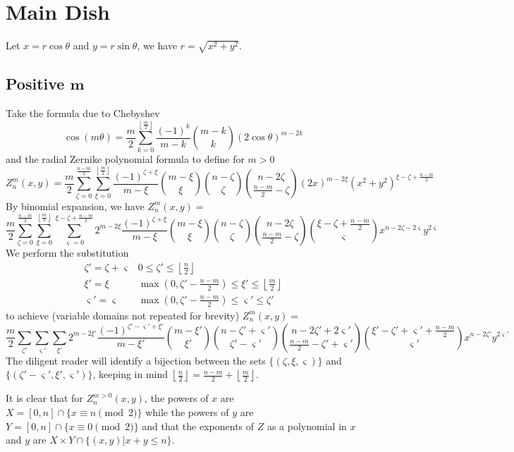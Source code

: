 \documentclass[showpacs,%
  nofootinbib,aps,superscriptaddress,%
  eqsecnum,prd,notitlepage,showkeys,10pt]{article}
\begin{document}
\section{Main Dish}
\label{sec:maindish}

Let $x=r\cos\theta$ and $y=r\sin\theta$, we have $r=\sqrt{x^2+y^2}$.

\subsection{Positive $\boldsymbol m$}
\label{sec:pm}
Take the formula due to Chebyshev
\[\cos(m\theta)=\frac m2\sum_{k=0}^{\left\lfloor\frac m2\right\rfloor}\frac{(-1)^k}{m-k}\binom{m-k}k(2\cos\theta)^{m-2k}\]
and the radial Zernike polynomial formula to define for $m>0$
\[Z_n^m(x,y)=\frac m2\sum_{\zeta=0}^{\frac{n-m}2}\sum_{\xi=0}^{\left\lfloor\frac m2\right\rfloor}\frac{(-1)^{\zeta+\xi}}{m-\xi}\binom{m-\xi}\xi\binom{n-\zeta}\zeta\binom{n-2\zeta}{\frac{n-m}2-\zeta}(2x)^{m-2\xi}\left(x^2+y^2\right)^{\xi-\zeta+\frac{n-m}2}\]
By binomial expansion, we have $Z_n^m(x,y)=$
\[\frac m2\sum_{\zeta=0}^{\frac{n-m}2}\sum_{\xi=0}^{\left\lfloor\frac m2\right\rfloor}\sum_{\varsigma=0}^{\xi-\zeta+\frac{n-m}2}2^{m-2\xi}\frac{(-1)^{\zeta+\xi}}{m-\xi}\binom{m-\xi}\xi\binom{n-\zeta}\zeta\binom{n-2\zeta}{\frac{n-m}2-\zeta}\binom{\xi-\zeta+\frac{n-m}2}\varsigma x^{n-2\zeta-2\varsigma}y^{2\varsigma}\]
We perform the substitution
\[\begin{array}{c|c}\zeta'=\zeta+\varsigma&0\leq\zeta'\leq\left\lfloor\frac n2\right\rfloor\\\xi'=\xi&\max\left(0,\zeta'-\frac{n-m}2\right)\leq\xi'\leq\left\lfloor\frac m2\right\rfloor\\\varsigma'=\varsigma&\max\left(0,\zeta'-\frac{n-m}2\right)\leq\varsigma'\leq\zeta'\end{array}\]
to achieve (variable domains not repeated for brevity) $Z_n^m(x,y)=$
\[\frac m2\sum_{\zeta'}\sum_{\varsigma'}\sum_{\xi'}2^{m-2\xi'}\frac{(-1)^{\zeta'-\varsigma'+\xi'}}{m-\xi'}\binom{m-\xi'}{\xi'}\binom{n-\zeta'+\varsigma'}{\zeta'-\varsigma'}\binom{n-2\zeta'+2\varsigma'}{\frac{n-m}2-\zeta'+\varsigma'}\binom{\xi'-\zeta'+\varsigma'+\frac{n-m}2}{\varsigma'}x^{n-2\zeta'}y^{2\varsigma'}\]
The diligent reader will identify a bijection between the sets $\{(\zeta,\xi,\varsigma)\}$ and $\{(\zeta'-\varsigma',\xi',\varsigma')\}$, keeping in mind $\left\lfloor\frac n2\right\rfloor=\frac{n-m}2+\left\lfloor\frac m2\right\rfloor$.

It is clear that for $Z_n^{m>0}(x,y)$, the powers of $x$ are $X=[0,n]\cap\{x\equiv n\pmod2\}$ while the powers of $y$ are $Y=[0,n]\cap\{x\equiv0\pmod2\}$ and that the exponents of $Z$ as a polynomial in $x$ and $y$ are $X\times Y\cap\{(x,y)|x+y\leq n\}$.
\end{document}
